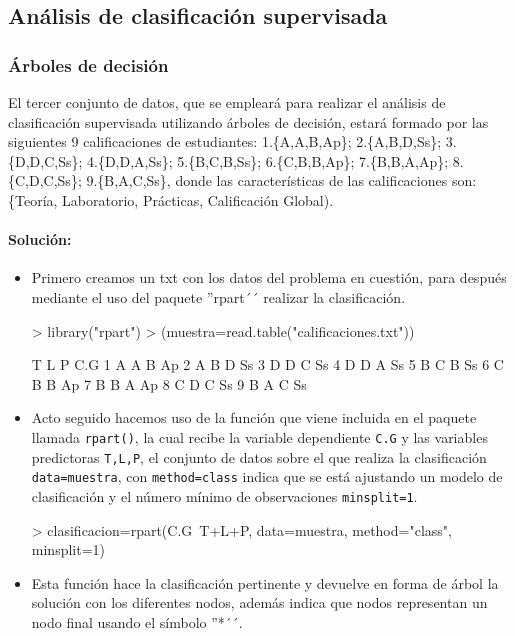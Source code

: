 \documentclass[a4paper, 12pt]{article}
\begin{document}
	\newpage

	\subsection{Análisis de clasificación supervisada}
	
	\subsubsection{Árboles de decisión}
	
	El tercer conjunto de datos, que se empleará para realizar el análisis de clasificación supervisada utilizando árboles de decisión, estará formado por las siguientes 9 calificaciones de estudiantes: 1.\{A,A,B,Ap\}; 2.\{A,B,D,Ss\}; 3.\{D,D,C,Ss\}; 4.\{D,D,A,Ss\}; 5.\{B,C,B,Ss\}; 6.\{C,B,B,Ap\}; 7.\{B,B,A,Ap\}; 8.\{C,D,C,Ss\}; 9.\{B,A,C,Ss\}, donde las características de las calificaciones son: \{Teoría, Laboratorio, Prácticas, Calificación Global).

	\paragraph{Solución:}
	\begin{itemize}
	  \item Primero creamos un txt con los datos del problema en cuestión, para después mediante el uso del paquete ''rpart´´ realizar la clasificación.
\begin{Schunk}
\begin{Sinput}
> library("rpart")
> (muestra=read.table("calificaciones.txt"))
\end{Sinput}
\begin{Soutput}
  T L P C.G
1 A A B  Ap
2 A B D  Ss
3 D D C  Ss
4 D D A  Ss
5 B C B  Ss
6 C B B  Ap
7 B B A  Ap
8 C D C  Ss
9 B A C  Ss
\end{Soutput}
\end{Schunk}

    	  \item Acto seguido hacemos uso de la función que viene incluida en el paquete llamada \texttt{rpart()}, la cual recibe la variable dependiente \texttt{C.G} y las variables predictoras \texttt{T,L,P}, el conjunto de datos sobre el que realiza la clasificación \texttt{data=muestra}, con \texttt{method=class} indica que se está ajustando un modelo de clasificación y el número mínimo de observaciones \texttt{minsplit=1}.
\begin{Schunk}
\begin{Sinput}
> clasificacion=rpart(C.G~T+L+P, data=muestra, method="class", minsplit=1)
\end{Sinput}
\end{Schunk}

    	  \item Esta función hace la clasificación pertinente y devuelve en forma de árbol la solución con los diferentes nodos, además indica que nodos representan un nodo final usando el símbolo ''*´´.
    
  	\end{itemize}
	
\end{document}
